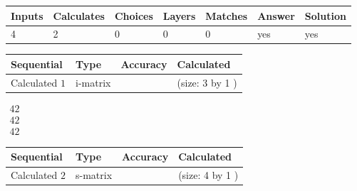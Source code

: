 \documentclass[12pt]{article}
\begin{document}
 
 
\noindent{}
 
 

 
 
 
\noindent{}
 
 

 
 
\noindent{}
 
 

 
\vspace{0.3in}
   
   
   
   
\noindent\begin{tabular}{|l|l|l|l|l|l|l|}
 \hline
Inputs & Calculates & Choices & Layers & Matches & Answer & Solution \\ \hline
           4  & 
           2  & 
           0
  & 
           0  & 
           0  & 
  yes & 
  yes 
  \\ \hline
 \end{tabular}
   
   
   
   
\noindent{}
   
   
  
  
\noindent\begin{tabular}{|l|l|l|l|}
\hline
 Sequential & Type & Accuracy & Calculated \\ 
\hline
 
 
  Calculated $            1 $ & i-matrix &  & 
 (size:            3  by            1 )
 \\  \hline  
 \end{tabular}
   
   
$\begin{array}{
 c
 }
          42  \\ 
          42  \\ 
          42
 \end{array}  $ 
  
  
\noindent\begin{tabular}{|l|l|l|l|}
\hline
 Sequential & Type & Accuracy & Calculated \\ 
\hline
 
 
  Calculated $            2 $ & s-matrix & & 
 (size:            4  by            1 )
 \\  \hline  
 \end{tabular}
   
\end{document}
